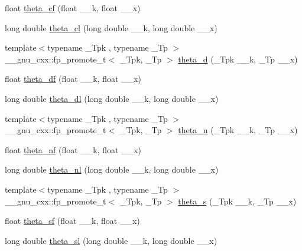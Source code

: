 \begin{DoxyCompactItemize}
\item 
float \hyperlink{group__gnu__math__spec__func_ga409f898afeaad5e25726ad552cfe6946}{theta\+\_\+cf} (float \+\_\+\+\_\+k, float \+\_\+\+\_\+x)
\item 
long double \hyperlink{group__gnu__math__spec__func_ga0531098c628999cf396217ff997cfdda}{theta\+\_\+cl} (long double \+\_\+\+\_\+k, long double \+\_\+\+\_\+x)
\item 
{\footnotesize template$<$typename \+\_\+\+Tpk , typename \+\_\+\+Tp $>$ }\\\+\_\+\+\_\+gnu\+\_\+cxx\+::fp\+\_\+promote\+\_\+t$<$ \+\_\+\+Tpk, \+\_\+\+Tp $>$ \hyperlink{group__gnu__math__spec__func_ga258edb995137d9e6344b3cd750266d74}{theta\+\_\+d} (\+\_\+\+Tpk \+\_\+\+\_\+k, \+\_\+\+Tp \+\_\+\+\_\+x)
\item 
float \hyperlink{group__gnu__math__spec__func_gad2dc6fcaf54d25cbfaad082623941118}{theta\+\_\+df} (float \+\_\+\+\_\+k, float \+\_\+\+\_\+x)
\item 
long double \hyperlink{group__gnu__math__spec__func_gacce4474168b9638ebeaad1c7b351fa04}{theta\+\_\+dl} (long double \+\_\+\+\_\+k, long double \+\_\+\+\_\+x)
\item 
{\footnotesize template$<$typename \+\_\+\+Tpk , typename \+\_\+\+Tp $>$ }\\\+\_\+\+\_\+gnu\+\_\+cxx\+::fp\+\_\+promote\+\_\+t$<$ \+\_\+\+Tpk, \+\_\+\+Tp $>$ \hyperlink{group__gnu__math__spec__func_ga202778bd650e04e9f3729bfca35c32e2}{theta\+\_\+n} (\+\_\+\+Tpk \+\_\+\+\_\+k, \+\_\+\+Tp \+\_\+\+\_\+x)
\item 
float \hyperlink{group__gnu__math__spec__func_ga5298a95e02bd909d55e59c1f2a0b51f8}{theta\+\_\+nf} (float \+\_\+\+\_\+k, float \+\_\+\+\_\+x)
\item 
long double \hyperlink{group__gnu__math__spec__func_ga907f6c147387d55d2dfccbc58d1f1bc5}{theta\+\_\+nl} (long double \+\_\+\+\_\+k, long double \+\_\+\+\_\+x)
\item 
{\footnotesize template$<$typename \+\_\+\+Tpk , typename \+\_\+\+Tp $>$ }\\\+\_\+\+\_\+gnu\+\_\+cxx\+::fp\+\_\+promote\+\_\+t$<$ \+\_\+\+Tpk, \+\_\+\+Tp $>$ \hyperlink{group__gnu__math__spec__func_gaf28f2dca107531890b49cccf2bdd67be}{theta\+\_\+s} (\+\_\+\+Tpk \+\_\+\+\_\+k, \+\_\+\+Tp \+\_\+\+\_\+x)
\item 
float \hyperlink{group__gnu__math__spec__func_ga5e69cf30c9a4cc057accc43e8c4bf7a3}{theta\+\_\+sf} (float \+\_\+\+\_\+k, float \+\_\+\+\_\+x)
\item 
long double \hyperlink{group__gnu__math__spec__func_gac574077067a4e7b24a0a9ff2d537d885}{theta\+\_\+sl} (long double \+\_\+\+\_\+k, long double \+\_\+\+\_\+x)

\end{DoxyCompactItemize}
